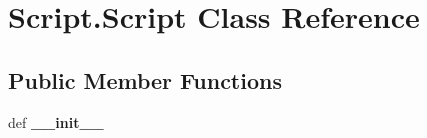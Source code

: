 \hypertarget{classScript_1_1Script}{\section{\-Script.\-Script \-Class \-Reference}
\label{classScript_1_1Script}
}
\subsection*{\-Public \-Member \-Functions}
\begin{DoxyCompactItemize}
\item 
\hypertarget{classScript_1_1Script_aaa7dd1905116549b57b5815417762ef1}{def {\bfseries \-\_\-\-\_\-init\-\_\-\-\_\-}}\label{classScript_1_1Script_aaa7dd1905116549b57b5815417762ef1}

\end{DoxyCompactItemize}
